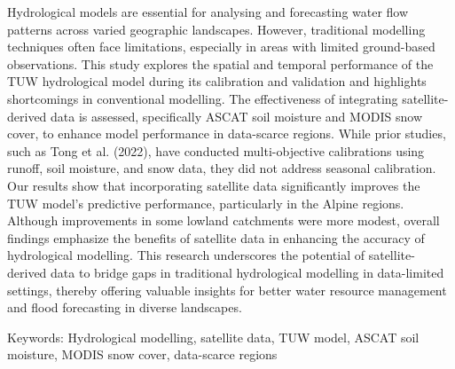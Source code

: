 \noindent

Hydrological models are essential for analysing and forecasting water flow patterns across varied geographic landscapes. However, traditional modelling techniques often face limitations, especially in areas with limited ground-based observations. This study explores the spatial and temporal performance of the TUW hydrological model during its calibration and validation and highlights shortcomings in conventional modelling. The effectiveness of integrating satellite-derived data is assessed, specifically ASCAT soil moisture and MODIS snow cover, to enhance model performance in data-scarce regions. While prior studies, such as Tong et al. (2022), have conducted multi-objective calibrations using runoff, soil moisture, and snow data, they did not address seasonal calibration. Our results show that incorporating satellite data significantly improves the TUW model's predictive performance, particularly in the Alpine regions. Although improvements in some lowland catchments were more modest, overall findings emphasize the benefits of satellite data in enhancing the accuracy of hydrological modelling. This research underscores the potential of satellite-derived data to bridge gaps in traditional hydrological modelling in data-limited settings, thereby offering valuable insights for better water resource management and flood forecasting in diverse landscapes.

Keywords: Hydrological modelling, satellite data, TUW model, ASCAT soil moisture, MODIS snow cover, data-scarce regions

